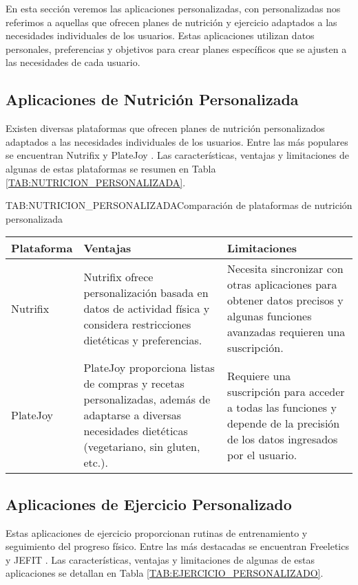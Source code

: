 En esta sección veremos las aplicaciones personalizadas, con personalizadas nos referimos a aquellas que ofrecen planes de nutrición y ejercicio adaptados a las necesidades individuales de los usuarios. Estas aplicaciones utilizan datos personales, preferencias y objetivos para crear planes específicos que se ajusten a las necesidades de cada usuario.

\subsection{Aplicaciones de Nutrición Personalizada}

Existen diversas plataformas que ofrecen planes de nutrición personalizados adaptados a las necesidades individuales de los usuarios. Entre las más populares se encuentran Nutrifix \cite{Nutrifix} y PlateJoy \cite{PlateJoy}. Las características, ventajas y limitaciones de algunas de estas plataformas se resumen en Tabla \ref{TAB:NUTRICION_PERSONALIZADA}.

\begin{table}[Plataformas de Nutrición Personalizada]{TAB:NUTRICION_PERSONALIZADA}{Comparación de plataformas de nutrición personalizada}
  \begin{tabular}{|p{3cm}|p{5cm}|p{5cm}|}
    \hline
    \textbf{Plataforma} & \textbf{Ventajas} & \textbf{Limitaciones} \\
    \hline
    Nutrifix & Nutrifix ofrece personalización basada en datos de actividad física y considera restricciones dietéticas y preferencias. & Necesita sincronizar con otras aplicaciones para obtener datos precisos y algunas funciones avanzadas requieren una suscripción. \\
    \hline
    PlateJoy & PlateJoy proporciona listas de compras y recetas personalizadas, además de adaptarse a diversas necesidades dietéticas (vegetariano, sin gluten, etc.). & Requiere una suscripción para acceder a todas las funciones y depende de la precisión de los datos ingresados por el usuario. \\
    \hline
  \end{tabular}
\end{table}

\subsection{Aplicaciones de Ejercicio Personalizado}

Estas aplicaciones de ejercicio proporcionan rutinas de entrenamiento y seguimiento del progreso físico. Entre las más destacadas se encuentran Freeletics \cite{Freeletics} y JEFIT \cite{JEFIT}. Las características, ventajas y limitaciones de algunas de estas aplicaciones se detallan en Tabla \ref{TAB:EJERCICIO_PERSONALIZADO}.

